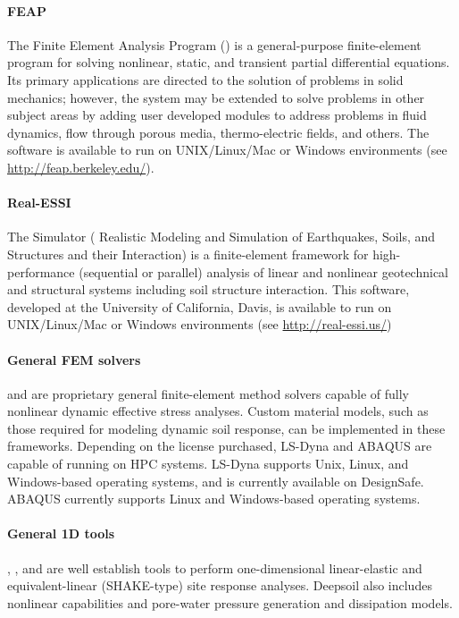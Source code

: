 \paragraph{FEAP} The Finite Element Analysis Program () is a general-purpose finite-element program for solving nonlinear, static, and transient partial differential equations. Its primary applications are directed to the solution of problems in solid mechanics; however, the system may be extended to solve problems in other subject areas by adding user developed modules to address problems in fluid dynamics, flow through porous media, thermo-electric fields, and others. The software is available to run on UNIX/Linux/Mac or Windows environments (see \url{http://feap.berkeley.edu/}).

\paragraph{Real-ESSI} The  Simulator ( Realistic Modeling and Simulation of Earthquakes, Soils, and Structures and their Interaction) is a finite-element framework for high-performance (sequential or parallel) analysis of linear and nonlinear geotechnical and structural systems including soil structure interaction. This software, developed at the University of California, Davis, is available to run on UNIX/Linux/Mac or Windows environments (see \url{http://real-essi.us/})

\paragraph{General FEM solvers}
 and  are  proprietary general finite-element method solvers capable of fully nonlinear dynamic effective stress analyses. Custom material models, such as those required for modeling dynamic soil response, can be implemented in these frameworks. Depending on the license purchased, LS-Dyna and ABAQUS are capable of running on HPC systems. LS-Dyna supports Unix, Linux, and Windows-based operating systems, and is currently available on DesignSafe. ABAQUS currently supports Linux and Windows-based operating systems.

\paragraph{General 1D tools}
, , and  are well establish tools to perform one-dimensional linear-elastic and equivalent-linear (SHAKE-type) site response analyses. Deepsoil also includes nonlinear capabilities and pore-water pressure generation and dissipation models.

